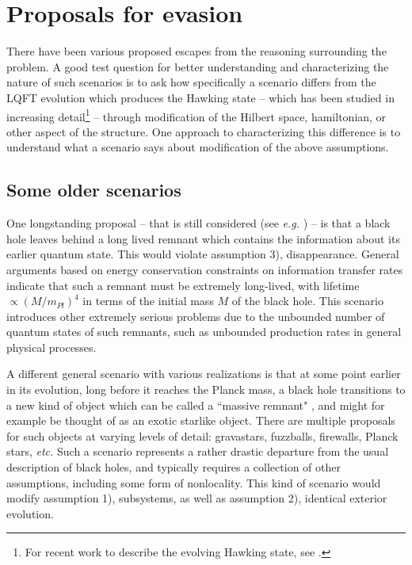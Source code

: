 \documentclass[11pt]{article}
\numberwithin{equation}{section}
\begin{document}
\section{Proposals for evasion}


There have been various proposed escapes from the reasoning surrounding the problem.  A good test question for better understanding and characterizing the nature of such scenarios is to ask how specifically a scenario differs from the LQFT evolution which produces the Hawking state --  which has been studied in increasing detail\footnote{For recent work to describe the evolving Hawking state, see \cite{SGsch,SG2d,GiPe}.} -- through modification of the Hilbert space, hamiltonian, or other aspect of the structure.  One approach to characterizing this difference is to understand what a scenario says about modification of the above assumptions.


\subsection{Some older scenarios}

One longstanding proposal -- that is still considered (see {\it e.g.} \cite{Bianchi:2018mml}) -- is that a black hole leaves behind a long lived remnant which contains the information about its earlier quantum state.  This would violate assumption 3), disappearance.  General arguments based on energy conservation constraints on information transfer rates\cite{CaWi,Pres} indicate that such a remnant must be extremely long-lived, with lifetime $\propto (M/m_{Pl})^4$ in terms of the initial mass $M$ of the black hole.   This scenario introduces other extremely serious problems\cite{WABHIP,Susstrouble} due to the unbounded number of quantum states of such remnants, such as unbounded production rates in general physical processes.

A different general scenario with various realizations is that at some point earlier in its evolution, long before it reaches the Planck mass, a black hole transitions to a new kind of object which can be called a ``massive remnant" \cite{BHMR}, and might for example be thought of as an exotic starlike object.  There are multiple proposals for such objects at varying levels of detail:  gravastars\cite{MaMo}, fuzzballs\cite{fuzzrev}, firewalls\cite{AMPS}, Planck stars\cite{RoVi}, {\it etc.}  Such a scenario represents a rather drastic departure from the usual description of black holes, and typically requires a collection of other assumptions, including some form of nonlocality.
This kind of scenario would modify assumption 1), subsystems, as well as assumption 2), identical exterior evolution.
\end{document}
